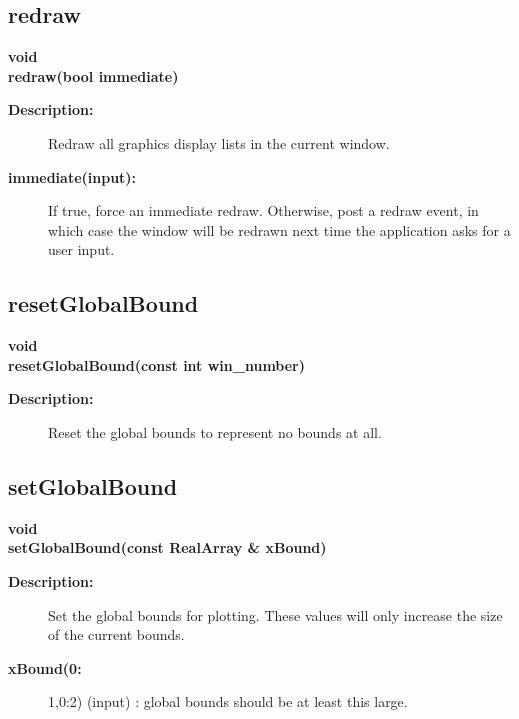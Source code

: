 \subsection{redraw}
 
\begin{flushleft} \textbf{%
void  \\ 
\settowidth{\GLGraphicsInterfaceIncludeArgIndent}{redraw(}%
redraw(bool immediate)
}\end{flushleft}
\begin{description}
\item[{\bf Description:}] 
 Redraw all graphics display lists in the current window.
\item[{\bf immediate(input):}]  If true, force an immediate redraw. Otherwise, post a redraw event, in which
 case the window will be redrawn next time the application asks for a user input.
\end{description}
\subsection{resetGlobalBound}
 
\begin{flushleft} \textbf{%
void  \\ 
\settowidth{\GLGraphicsInterfaceIncludeArgIndent}{resetGlobalBound(}%
resetGlobalBound(const int win\_number)
}\end{flushleft}
\begin{description}
\item[{\bf Description:}] 
   Reset the global bounds to represent no bounds at all.

\end{description}
\subsection{setGlobalBound}
 
\begin{flushleft} \textbf{%
void  \\ 
\settowidth{\GLGraphicsInterfaceIncludeArgIndent}{setGlobalBound(}%
setGlobalBound(const RealArray \& xBound)
}\end{flushleft}
\begin{description}
\item[{\bf Description:}] 
   Set the global bounds for plotting. These values will only increase the 
 size of the current bounds.
\item[{\bf xBound(0:}] 1,0:2) (input) : global bounds should be at least this large.

\end{description}
